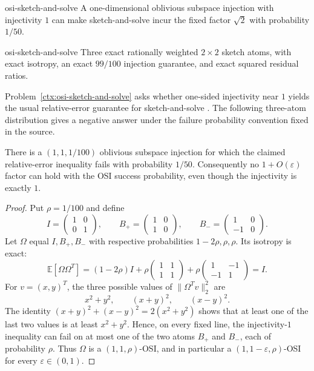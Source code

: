 \begin{cxsummary}{osi-sketch-and-solve}
A one-dimensional oblivious subspace injection with injectivity $1$ can make
sketch-and-solve incur the fixed factor $\sqrt2$ with probability $1/50$.
\end{cxsummary}

\begin{cxcertificate}{osi-sketch-and-solve}
Three exact rationally weighted $2\times2$ sketch atoms, with exact isotropy,
an exact $99/100$ injection guarantee, and exact squared residual ratios.
\end{cxcertificate}

\begin{cxrefutation}
Problem~\ref{ctx:osi-sketch-and-solve} asks whether one-sided injectivity
near $1$ yields the usual relative-error guarantee for sketch-and-solve
\cite{AmselEtAl2026}.  The
following three-atom distribution gives a negative answer under the failure
probability convention fixed in the source.

\begin{theorem}
\label{thm:osi-sketch-and-solve}
There is a $(1,1,1/100)$ oblivious subspace injection for which the claimed
relative-error inequality fails with probability $1/50$.  Consequently no
$1+O(\varepsilon)$ factor can hold with the OSI success probability, even
though the injectivity is exactly $1$.
\end{theorem}
\begin{proof}
Put $\rho=1/100$ and define
\[
 I=\begin{pmatrix}1&0\\0&1\end{pmatrix},\qquad
 B_+=\begin{pmatrix}1&0\\1&0\end{pmatrix},\qquad
 B_-=\begin{pmatrix}1&0\\-1&0\end{pmatrix}.
\]
Let $\Omega$ equal $I,B_+,B_-$ with respective probabilities
$1-2\rho,\rho,\rho$.  Its isotropy is exact:
\[
 \mathbb E[\Omega\Omega^T]
 =(1-2\rho)I+\rho
 \begin{pmatrix}1&1\\1&1\end{pmatrix}
 +\rho\begin{pmatrix}1&-1\\-1&1\end{pmatrix}=I.
\]
For $v=(x,y)^T$, the three possible values of
$\|\Omega^Tv\|_2^2$ are
\[
 x^2+y^2,\qquad (x+y)^2,\qquad (x-y)^2.
\]
The identity
$(x+y)^2+(x-y)^2=2(x^2+y^2)$ shows that at least one of the
last two values is at least $x^2+y^2$.  Hence, on every fixed line, the
injectivity-$1$ inequality can fail on at most one of the two atoms $B_+$ and
$B_-$, each of probability $\rho$.  Thus $\Omega$ is a
$(1,1,\rho)$-OSI, and in particular a $(1,1-\varepsilon,\rho)$-OSI for every
$\varepsilon\in(0,1)$.


\end{proof}
\end{cxrefutation}
